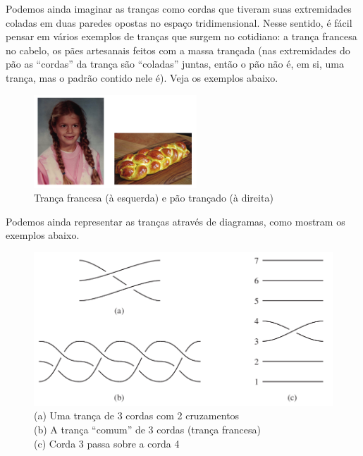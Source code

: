 	\par\vspace{0.3cm} Podemos ainda imaginar as tranças como cordas que tiveram suas extremidades coladas 
	em duas paredes opostas no espaço tridimensional. Nesse sentido, é fácil pensar em vários exemplos de tranças
	que surgem no cotidiano: a trança francesa no cabelo, os pães artesanais feitos com a massa trançada 
	(nas extremidades do pão as ``cordas'' da trança são ``coladas'' juntas, então o pão não é, em si, 
	uma trança, mas o padrão contido nele é). Veja os exemplos abaixo.
	\begin{figure}[H]
		\begin{center}
			\includegraphics[width=6.1cm]{Images/exemplos_trancas.png}
		\end{center}
		\caption{Trança francesa (à esquerda) e pão trançado (à direita)}\label{exemplos de trancas}
	\end{figure}
    \par\vspace{0.3cm} Podemos ainda representar as tranças através de diagramas, como mostram os exemplos abaixo.
	\begin{figure}[H]
		\captionsetup{justification=centering}
		\begin{center}
			\includegraphics[width=12cm]{Images/exemplos_diagrama.png}
			\caption{
				(a) Uma trança de 3 cordas com 2 cruzamentos \\
				(b) A trança ``comum'' de 3 cordas (trança francesa) \\
				(c) Corda 3 passa sobre a corda 4}
				\label{diagramas de trancas}\end{center}
	\end{figure}
